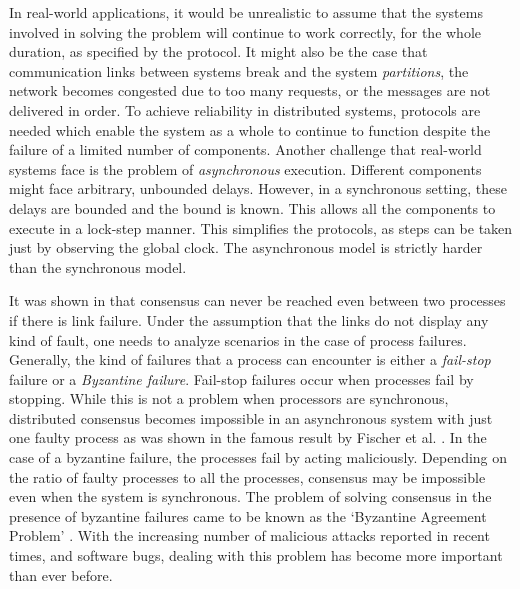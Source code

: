 In real-world applications, it would be unrealistic to assume that the systems involved in solving the problem will continue to work correctly, for the whole duration, as specified by the protocol. It might also be the case that communication links between systems break and the system \textit{partitions}, the network becomes congested due to too many requests, or the messages are not delivered in order. To achieve reliability in distributed systems, protocols are needed which enable the system as a whole to continue to function despite the failure of a limited number of components. Another challenge that real-world systems face is the problem of \textit{asynchronous} execution. Different components might face arbitrary, unbounded delays. However, in a synchronous setting, these delays are bounded and the bound is known. This allows all the components to execute in a lock-step manner. This simplifies the protocols, as steps can be taken just by observing the global clock. The asynchronous model is strictly harder than the synchronous model. 

It was shown in \cite{LamportSP82} that consensus can never be reached even between two processes if there is link failure. Under the assumption that the links do not display any kind of fault, one needs to analyze scenarios in the case of process failures. Generally, the kind of failures that a process can encounter is either a \textit{fail-stop} failure or a \textit{Byzantine failure}. Fail-stop failures occur when processes fail by stopping. While this is not a problem when processors are synchronous, distributed consensus becomes impossible in an asynchronous system with just one faulty process as was shown in the famous result by Fischer et al. \cite{FischerLP83}. In the case of a byzantine failure, the processes fail by acting maliciously. Depending on the ratio of faulty processes to all the processes, consensus may be impossible even when the system is synchronous. The problem of solving consensus in the presence of byzantine failures came to be known as the `Byzantine Agreement Problem' \cite{LamportSP82}. With the increasing number of malicious attacks reported in recent times, and software bugs, dealing with this problem has become more important than ever before.

